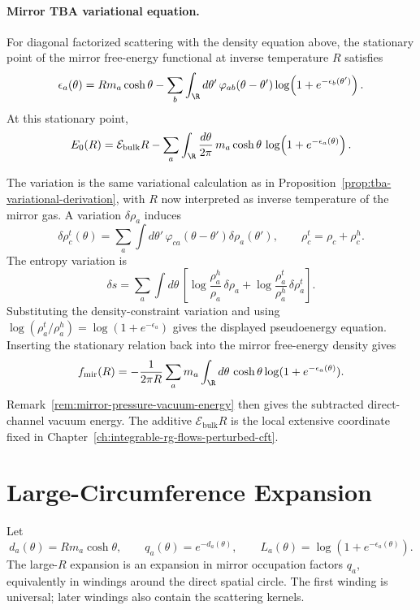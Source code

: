 \paragraph{Mirror TBA variational equation.}
For diagonal factorized scattering with the density equation above, the
stationary point of the mirror free-energy functional at inverse temperature
\(R\) satisfies
\[
  \epsilon_a(\theta)
  =
  Rm_a\cosh\theta
  -
  \sum_b\int_{\R}d\theta'\,
  \varphi_{ab}(\theta-\theta')
  \log\!\left(1+e^{-\epsilon_b(\theta')}\right).
\]
At this stationary point,
\[
  E_0(R)=\mathcal E_{\mathrm{bulk}}R
  -
  \sum_a\int_{\R}\frac{d\theta}{2\pi}\,
  m_a\cosh\theta\,
  \log\!\left(1+e^{-\epsilon_a(\theta)}\right).
\]

The variation is the same variational calculation as in
Proposition~\ref{prop:tba-variational-derivation}, with \(R\) now interpreted
as inverse temperature of the mirror gas.  A variation \(\delta\rho_a\)
induces
\[
  \delta\rho_c^t(\theta)
  =
  \sum_a\int d\theta'\,
  \varphi_{ca}(\theta-\theta')\delta\rho_a(\theta'),
  \qquad
  \rho_c^t=\rho_c+\rho_c^h .
\]
The entropy variation is
\[
  \delta s
  =
  \sum_a\int d\theta\,
  \left[
  \log\frac{\rho_a^h}{\rho_a}\,\delta\rho_a
  +
  \log\frac{\rho_a^t}{\rho_a^h}\,\delta\rho_a^t
  \right].
\]
Substituting the density-constraint variation and using
\(\log(\rho_a^t/\rho_a^h)=\log(1+e^{-\epsilon_a})\) gives the displayed
pseudoenergy equation.  Inserting the stationary relation back into the
mirror free-energy density gives
\[
  f_{\mathrm{mir}}(R)
  =
  -\frac{1}{2\pi R}
  \sum_a m_a\int_{\R}d\theta\,\cosh\theta
  \log(1+e^{-\epsilon_a(\theta)}).
\]
Remark~\ref{rem:mirror-pressure-vacuum-energy} then gives the
subtracted direct-channel vacuum energy.  The additive
\(\mathcal E_{\mathrm{bulk}}R\) is the local extensive coordinate fixed in
Chapter~\ref{ch:integrable-rg-flows-perturbed-cft}.

\section{Large-Circumference Expansion}

Let
\[
  d_a(\theta)=Rm_a\cosh\theta,\qquad
  q_a(\theta)=e^{-d_a(\theta)},\qquad
  L_a(\theta)=\log(1+e^{-\epsilon_a(\theta)}).
\]
The large-\(R\) expansion is an expansion in mirror occupation factors
\(q_a\), equivalently in windings around the direct spatial circle.  The
first winding is universal; later windings also contain the scattering
kernels.

